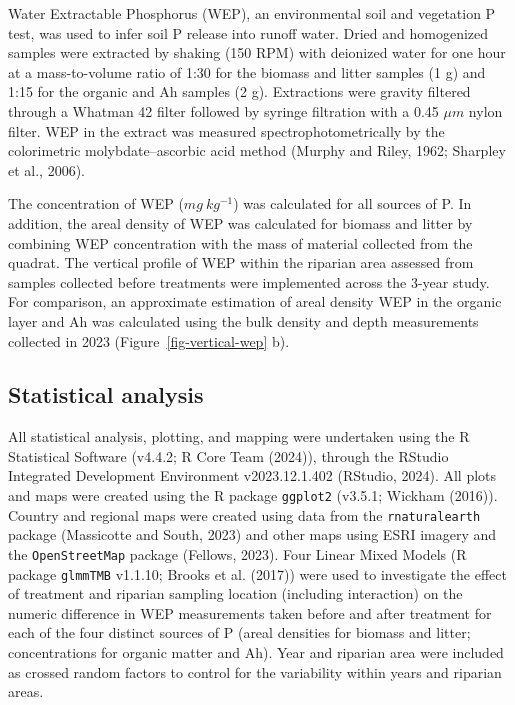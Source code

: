 \documentclass[
]{agujournal2019}
\begin{document}
Water Extractable Phosphorus (WEP), an environmental soil and vegetation
P test, was used to infer soil P release into runoff water. Dried and
homogenized samples were extracted by shaking (150 RPM) with deionized
water for one hour at a mass-to-volume ratio of 1:30 for the biomass and
litter samples (1 g) and 1:15 for the organic and Ah samples (2 g).
Extractions were gravity filtered through a Whatman 42 filter followed
by syringe filtration with a 0.45 \(\mu m\) nylon filter. WEP in the
extract was measured spectrophotometrically by the colorimetric
molybdate--ascorbic acid method (Murphy and Riley, 1962; Sharpley et
al., 2006).

The concentration of WEP (\(mg~kg^{-1}\)) was calculated for all sources
of P. In addition, the areal density of WEP was calculated for biomass
and litter by combining WEP concentration with the mass of material
collected from the quadrat. The vertical profile of WEP within the
riparian area assessed from samples collected before treatments were
implemented across the 3-year study. For comparison, an approximate
estimation of areal density WEP in the organic layer and Ah was
calculated using the bulk density and depth measurements collected in
2023 (Figure~\ref{fig-vertical-wep} b).

\subsection{Statistical analysis}\label{statistical-analysis}

All statistical analysis, plotting, and mapping were undertaken using
the R Statistical Software (v4.4.2; R Core Team (2024)), through the
RStudio Integrated Development Environment v2023.12.1.402 (RStudio,
2024). All plots and maps were created using the R package
\texttt{ggplot2} (v3.5.1; Wickham (2016)). Country and regional maps
were created using data from the \texttt{rnaturalearth} package
(Massicotte and South, 2023) and other maps using ESRI imagery and the
\texttt{OpenStreetMap} package (Fellows, 2023). Four Linear Mixed Models
(R package \texttt{glmmTMB} v1.1.10; Brooks et al. (2017)) were used to
investigate the effect of treatment and riparian sampling location
(including interaction) on the numeric difference in WEP measurements
taken before and after treatment for each of the four distinct sources
of P (areal densities for biomass and litter; concentrations for organic
matter and Ah). Year and riparian area were included as crossed random
factors to control for the variability within years and riparian areas.
\end{document}
